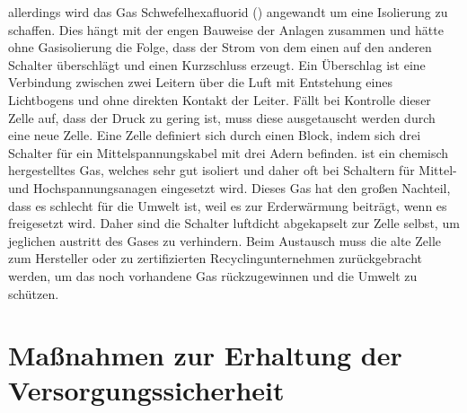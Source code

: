 allerdings wird das Gas Schwefelhexafluorid () angewandt um eine Isolierung zu schaffen. Dies hängt mit der engen Bauweise der Anlagen zusammen und hätte 
ohne Gasisolierung die Folge, dass der Strom von dem einen auf den anderen Schalter überschlägt und einen Kurzschluss erzeugt. Ein Überschlag ist eine 
Verbindung zwischen zwei Leitern über die Luft mit Entstehung eines Lichtbogens und ohne direkten Kontakt der Leiter. Fällt bei Kontrolle dieser  Zelle 
auf, dass der Druck zu gering ist, muss diese ausgetauscht werden durch eine neue Zelle.
Eine Zelle definiert sich durch einen Block, indem sich drei Schalter 
für ein Mittelspannungskabel mit drei Adern befinden.  ist ein chemisch hergestelltes Gas, welches sehr gut isoliert und daher oft bei Schaltern für 
Mittel- und Hochspannungsanagen eingesetzt wird. Dieses Gas hat den großen Nachteil, dass es schlecht für die Umwelt ist, weil es zur Erderwärmung beiträgt, 
wenn es freigesetzt wird. Daher sind die  Schalter luftdicht abgekapselt zur Zelle selbst, um jeglichen austritt des Gases zu verhindern. Beim Austausch 
muss die alte Zelle zum Hersteller oder zu zertifizierten Recyclingunternehmen zurückgebracht werden, um das noch vorhandene Gas rückzugewinnen und die 
Umwelt zu schützen. \autocite{Schwab.2012}
\clearpage

\section{Maßnahmen zur Erhaltung der Versorgungssicherheit}

